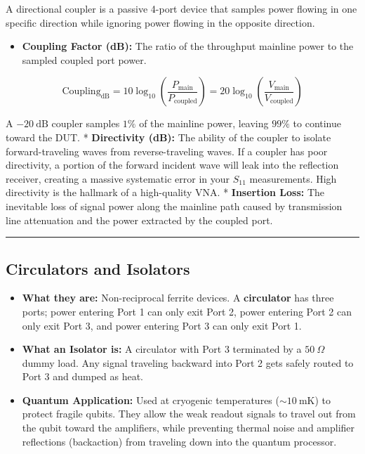 \documentclass[
]{article}
\providecommand{\tightlist}{%
  \setlength{\itemsep}{0pt}\setlength{\parskip}{0pt}}
\begin{document}
A directional coupler is a passive 4-port device that samples power
flowing in one specific direction while ignoring power flowing in the
opposite direction.

\begin{itemize}
\tightlist
\item
  \textbf{Coupling Factor (dB):} The ratio of the throughput mainline
  power to the sampled coupled port power.
\end{itemize}

\[\text{Coupling}_{\text{dB}} = 10 \log_{10}\left(\frac{P_{\text{main}}}{P_{\text{coupled}}}\right) = 20 \log_{10}\left(\frac{V_{\text{main}}}{V_{\text{coupled}}}\right)\]

A \(-20\ \text{dB}\) coupler samples \(1\%\) of the mainline power,
leaving \(99\%\) to continue toward the DUT. * \textbf{Directivity
(dB):} The ability of the coupler to isolate forward-traveling waves
from reverse-traveling waves. If a coupler has poor directivity, a
portion of the forward incident wave will leak into the reflection
receiver, creating a massive systematic error in your \(S_{11}\)
measurements. High directivity is the hallmark of a high-quality VNA. *
\textbf{Insertion Loss:} The inevitable loss of signal power along the
mainline path caused by transmission line attenuation and the power
extracted by the coupled port.

\begin{center}\rule{0.5\linewidth}{0.5pt}\end{center}

\subsection{Circulators and Isolators}\label{circulators-and-isolators}

\begin{itemize}
\tightlist
\item
  \textbf{What they are:} Non-reciprocal ferrite devices. A
  \textbf{circulator} has three ports; power entering Port 1 can only
  exit Port 2, power entering Port 2 can only exit Port 3, and power
  entering Port 3 can only exit Port 1.
\item
  \textbf{What an Isolator is:} A circulator with Port 3 terminated by a
  \(50\ \Omega\) dummy load. Any signal traveling backward into Port 2
  gets safely routed to Port 3 and dumped as heat.
\item
  \textbf{Quantum Application:} Used at cryogenic temperatures
  (\(\sim 10\ \text{mK}\)) to protect fragile qubits. They allow the
  weak readout signals to travel out from the qubit toward the
  amplifiers, while preventing thermal noise and amplifier reflections
  (backaction) from traveling down into the quantum processor.
\end{itemize}
\end{document}
